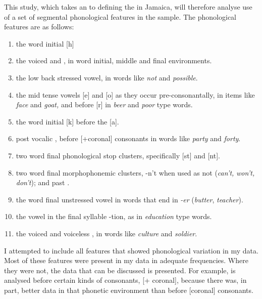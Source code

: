 This study, which takes an  to defining the  in Jamaica, will therefore analyse use of a set of segmental phonological features in the  sample.  The phonological features are as follows:
\begin{enumerate}[label=\alph*)]
\item  the word initial  [h] 
\item  the voiced and , in word initial, middle and final environments. 
\item  the low back stressed vowel, in words like \textit{not} and \textit{possible}.
\item  the mid tense vowels [e] and [o] as they occur pre-consonantally, in items like \textit{face} and \textit{goat,} and before [r] in \textit{beer} and \textit{poor} type words. 
\item  the word initial  [k] before the  [a].
\item  post vocalic , before [+coronal] consonants in words like \textit{party} and \textit{forty}. 
\item  two word final phonological stop clusters, specifically [st] and [nt].
\item  two word final morphophonemic clusters, -n’t when used as not (\textit{can’t,} \textit{won’t,} \textit{don’t}); and past .
\item  the word final unstressed vowel in words that end in \textit{-er} (\textit{butter}, \textit{teacher}).
\item  the vowel in the final syllable -tion, as in \textit{education} type words.
\item  the voiced and voiceless , in words like \textit{culture} and \textit{soldier}. 
\end{enumerate}


I attempted to include all features that showed phonological variation in my data.  Most of these features were present in my data in adequate frequencies.  Where they were not, the data that can be discussed is presented.  For example,  is analysed before certain kinds of consonants, [+ coronal], because there was, in part, better data in that phonetic environment than before [\textminus coronal] consonants.  

